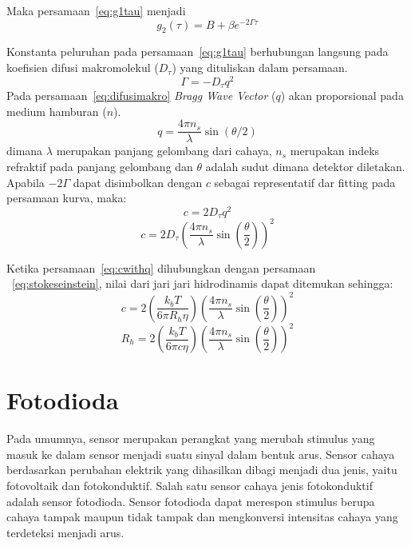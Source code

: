 \noindent
Maka persamaan~\ref{eq:g1tau} menjadi
\begin{equation}
    g_2(\tau) = B + \beta e^{-2\Gamma \tau}
\end{equation}

Konstanta peluruhan pada persamaan~\ref{eq:g1tau} berhubungan langsung pada koefisien difusi
makromolekul (${D_{\tau}}$) yang dituliskan dalam persamaan.
\begin{equation}
    \Gamma = -D_{\tau} q^2
    \label{eq:difusimakro}
\end{equation}
\noindent
Pada persamaan~\ref{eq:difusimakro} \textit{Bragg Wave Vector} (${q}$) akan proporsional pada
medium hamburan (${n}$).
\begin{equation}
    q = \frac{4\pi n_s}{\lambda} \sin (\theta / 2)
    \label{eq:q}
\end{equation}
\noindent
dimana ${\lambda}$ merupakan panjang gelombang dari cahaya, ${n_s}$ merupakan indeks refraktif
pada panjang gelombang dan ${\theta}$ adalah sudut dimana
detektor diletakan. Apabila ${-2 \Gamma}$ dapat disimbolkan dengan ${c}$ sebagai representatif
dar fitting pada persamaan kurva, maka:
\begin{equation}
    c = 2 D_{\tau} q^2
    \label{eq:c}
\end{equation}
\begin{equation}
    c = 2 D_{\tau} \left( \frac{4\pi n_s}{\lambda} \sin \left( \frac{\theta}{2}\right) \right)^2
    \label{eq:cwithq}
\end{equation}

Ketika persamaan~\ref{eq:cwithq} dihubungkan dengan persamaan ~\ref{eq:stokeseinstein},
nilai dari jari jari hidrodinamis dapat ditemukan sehingga:
\begin{equation*}
    c = 2 \left(\frac{k_b T}{6 \pi R_h \eta} \right) \left( \frac{4\pi n_s}{\lambda} \sin \left( \frac{\theta}{2}\right) \right)^2
\end{equation*}
\begin{equation}
    R_h = 2 \left(\frac{k_b T}{6 \pi c \eta} \right) \left( \frac{4\pi n_s}{\lambda} \sin \left( \frac{\theta}{2}\right) \right)^2
    \label{eq:rh}
\end{equation}



\section{Fotodioda}
Pada umumnya, sensor merupakan perangkat yang merubah stimulus yang masuk ke dalam sensor menjadi
suatu sinyal dalam bentuk arus. Sensor cahaya berdasarkan perubahan elektrik yang dihasilkan dibagi
menjadi dua jenis, yaitu fotovoltaik dan fotokonduktif. Salah satu sensor cahaya jenis fotokonduktif
adalah sensor fotodioda. Sensor fotodioda dapat merespon stimulus berupa cahaya tampak maupun tidak
tampak dan mengkonversi intensitas cahaya yang terdeteksi menjadi arus\cite{Setyaningsih2017}.

